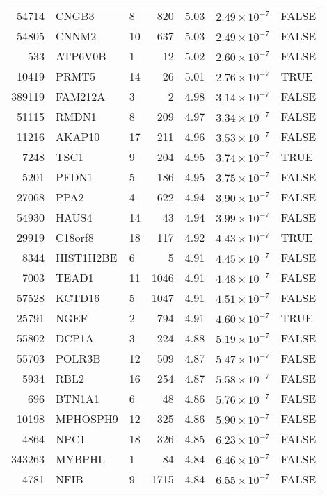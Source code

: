 \begin{table}[ht]
\begin{adjustbox}{totalheight=10in}
\begin{tabular}{rllrrrl}
  54714 & CNGB3 & 8 & 820 & 5.03 & $2.49 \times 10^{-7}$ & FALSE \\ 
  54805 & CNNM2 & 10 & 637 & 5.03 & $2.49 \times 10^{-7}$ & FALSE \\ 
  533 & ATP6V0B & 1 &  12 & 5.02 & $2.60 \times 10^{-7}$ & FALSE \\ 
  10419 & PRMT5 & 14 &  26 & 5.01 & $2.76 \times 10^{-7}$ & TRUE \\ 
  389119 & FAM212A & 3 &   2 & 4.98 & $3.14 \times 10^{-7}$ & FALSE \\ 
  51115 & RMDN1 & 8 & 209 & 4.97 & $3.34 \times 10^{-7}$ & FALSE \\ 
  11216 & AKAP10 & 17 & 211 & 4.96 & $3.53 \times 10^{-7}$ & FALSE \\ 
  7248 & TSC1 & 9 & 204 & 4.95 & $3.74 \times 10^{-7}$ & TRUE \\ 
  5201 & PFDN1 & 5 & 186 & 4.95 & $3.75 \times 10^{-7}$ & FALSE \\ 
  27068 & PPA2 & 4 & 622 & 4.94 & $3.90 \times 10^{-7}$ & FALSE \\ 
  54930 & HAUS4 & 14 &  43 & 4.94 & $3.99 \times 10^{-7}$ & FALSE \\ 
  29919 & C18orf8 & 18 & 117 & 4.92 & $4.43 \times 10^{-7}$ & TRUE \\ 
  8344 & HIST1H2BE & 6 &   5 & 4.91 & $4.45 \times 10^{-7}$ & FALSE \\ 
  7003 & TEAD1 & 11 & 1046 & 4.91 & $4.48 \times 10^{-7}$ & FALSE \\ 
  57528 & KCTD16 & 5 & 1047 & 4.91 & $4.51 \times 10^{-7}$ & FALSE \\ 
  25791 & NGEF & 2 & 794 & 4.91 & $4.60 \times 10^{-7}$ & TRUE \\ 
  55802 & DCP1A & 3 & 224 & 4.88 & $5.19 \times 10^{-7}$ & FALSE \\ 
  55703 & POLR3B & 12 & 509 & 4.87 & $5.47 \times 10^{-7}$ & FALSE \\ 
  5934 & RBL2 & 16 & 254 & 4.87 & $5.58 \times 10^{-7}$ & FALSE \\ 
  696 & BTN1A1 & 6 &  48 & 4.86 & $5.76 \times 10^{-7}$ & FALSE \\ 
  10198 & MPHOSPH9 & 12 & 325 & 4.86 & $5.90 \times 10^{-7}$ & FALSE \\ 
  4864 & NPC1 & 18 & 326 & 4.85 & $6.23 \times 10^{-7}$ & FALSE \\ 
  343263 & MYBPHL & 1 &  84 & 4.84 & $6.46 \times 10^{-7}$ & FALSE \\ 
  4781 & NFIB & 9 & 1715 & 4.84 & $6.55 \times 10^{-7}$ & FALSE \\ 

\end{tabular}
\end{adjustbox}
\end{table}
